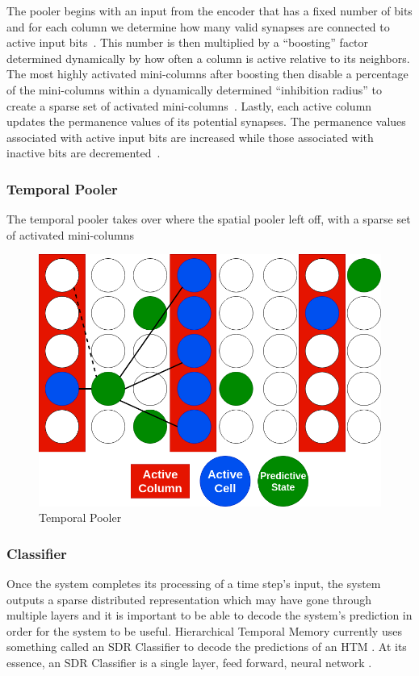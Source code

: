 \documentclass[oneside,12pt,openany]{book}
\begin{document}
	
	The pooler begins with an input from the encoder that has a fixed number of bits and for each column we determine how many valid synapses are connected to active input bits~\cite{Whitepaper}. This number is then multiplied by a ``boosting'' factor determined dynamically by how often a column is active relative to its neighbors. The most highly activated mini-columns after boosting then disable a percentage of the mini-columns within a dynamically determined ``inhibition radius'' to create a sparse set of activated mini-columns~\cite{Whitepaper}. Lastly, each active column updates the permanence values of its potential synapses. The permanence values associated with active input bits are increased while those associated with inactive bits are decremented~\cite{Whitepaper}.

	
	\subsubsection{Temporal Pooler}

	The temporal pooler takes over where the spatial pooler left off, with a sparse set of activated mini-columns

	\begin{figure}[!ht]
		\centering
		\includegraphics[width=.8\linewidth]{images/TemporalPooler.png}
		\caption{Temporal Pooler}
		\label{fig:TemporalPooler}
	\end{figure}

	\subsubsection{Classifier}
	
	Once the system completes its processing of a time step's input, the system outputs a sparse distributed representation which may have gone through multiple layers and it is important to be able to decode the system's prediction in order for the system to be useful. Hierarchical Temporal Memory currently uses something called an SDR Classifier to decode the predictions of an HTM \cite{Dillon}. At its essence, an SDR Classifier is a single layer, feed forward, neural network \cite{Dillon}.
	
\end{document}

